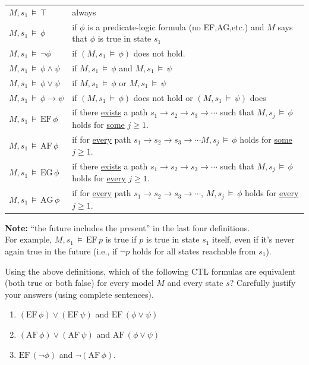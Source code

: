 \documentclass[12pt,letterpaper,boxed,cm]{hmcpset}
\newcommand{\ra}[0]{\rightarrow}
\newcommand{\turn}[0]{\,\vDash\,}
\newcommand{\EF}[0]{\text{EF}\,}
\newcommand{\AF}[0]{\text{AF}\,}
\newcommand{\EG}[0]{\text{EG}\,}
\newcommand{\AG}[0]{\text{AG}\,}
\begin{document}
\begin{center}
    \begin{tabular}{l l}
        $M, s_1 \turn \top$           & always \\
        $M,s_1 \turn \phi$            & if $\phi$ is a predicate-logic formula (no EF,AG,etc.)
                                       and $M$ says that $\phi$ is true in state $s_1$ \\
        $M,s_1 \turn \neg\phi$        & if $(M,s_1 \turn \phi)$ does not hold. \\
        $M,s_1 \turn \phi \land \psi$ & if $M,s_1 \turn \phi$ and $M,s_1 \turn \psi$ \\
        $M,s_1 \turn \phi \lor \psi$  & if $ M,s_1 \turn \phi$ or $ M,s_1 \turn \psi$ \\
        $M,s_1 \turn \phi \ra \psi$   & if $(M,s_1 \turn \phi)$ does not hold or $(M,s_1 \turn \psi)$ does \\
        $M,s_1 \turn \EF \phi$        & if there \ul{exists} a path $s_1 \ra s_2 \ra s_3 \ra \cdots$  such that
                                       $M,s_j \turn \phi$  holds for \ul{some} $j \ge 1$. \\
        $M,s_1 \turn \AF \phi$        & if for \ul{every} path $s_1 \ra s_2 \ra s_3 \ra \cdots M,s_j \turn \phi$ 
                                       holds for \ul{some} $j \ge 1$. \\
        $M,s_1 \turn \EG \phi$        & if there \ul{exists} a path $s_1 \ra s_2 \ra s_3 \ra \cdots$  such that
                                       $M,s_j \turn \phi$  holds for \ul{every} $j \ge 1$. \\
        $M,s_1 \turn \AG \phi$        & if for \ul{every} path $s_1 \ra s_2 \ra s_3 \ra \cdots$,  $M,s_j \turn \phi$  
                                       holds for \ul{every} $j \ge 1$.
    \end{tabular}
\end{center}

\textbf{Note:}  ``the future includes the present'' in the last four definitions.\\
For example, $M,s_1 \turn \EF p$  is true if $p$ is true in state $s_1$ itself, 
even if it's never again true in the future (i.e., if $\neg p$ holds for all states reachable from $s_1$).
\newpage

\begin{problem}[1.]
    [15 points] Using the above definitions, which of the following CTL formulas are equivalent (both true or both false) for every model $M$ and every state $s$?  Carefully justify your answers (using complete sentences).
    \begin{enumerate}[label=\Alph*.]
        \item $(\EF \phi) \lor (\EF \psi)$   and    $\EF (\phi \lor \psi)$
        \item $(\AF \phi) \lor (\AF \psi)$    and   $\AF (\phi \lor \psi)$
        \item $\EF (\neg\phi)$   and    $\neg(\AF \phi)$.
    \end{enumerate}
\end{problem}
\end{document}
